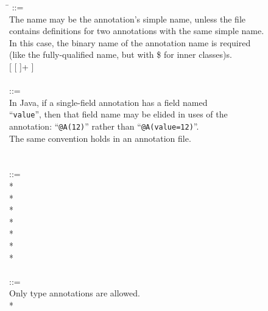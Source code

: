 \documentclass{article}
\begin{document}
\begin{tabbing}
\qquad \= \kill
{} ::= \\
\qquad    \bnfcmt The name may be the annotation's simple name, unless the file \\
\qquad    \bnfcmt contains definitions for two annotations with the same simple name. \\
\qquad    \bnfcmt In this case, the binary name of the annotation name is required \\
\qquad    \bnfcmt (like the fully-qualified name, but with \$ for inner classes)s. \\
\qquad    {} [ \bnflit{(}  [ \bnflit{,}  ]+ \bnflit{)} ] \\
\\
 ::= \\
\qquad    \bnfcmt In Java, if a single-field annotation has a field named \\
\qquad    \bnfcmt ``\texttt{value}'', then that field name may be elided in uses
of the \\ \qquad    \bnfcmt annotation:   ``\texttt{@A(12)}'' rather than ``\texttt{@A(value=12)}''. \\
\qquad    \bnfcmt The same convention holds in an annotation file. \\
\qquad    {} \bnflit{=}  \\
\\
 ::= \\
\qquad    {}  \bnflit{:} * \lineend  \\
\qquad        {}* \\
\qquad        {}* \\
\qquad        {}* \\
\qquad        {}* \\
\qquad        {}*  \\
\qquad        {}* \\
\\
 ::= \\
\qquad    \bnfcmt Only type annotations are allowed.\\
\qquad    {} \bnflit{:} * \lineend  \\

\end{tabbing}
\end{document}
